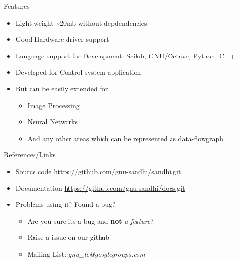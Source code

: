\documentclass{beamer}
\begin{document}
\begin{frame}{Features}

\begin{itemize}
  \item Light-weight \textasciitilde 20mb without depdendencies
  \item Good Hardware driver support
  \item Language support for Development: Scilab, GNU/Octave, Python, C++
  \item Developed for Control system application
  \item But can be easily extended for
  \begin{itemize}
  	\item Image Processing
	\item Neural Networks
	\item And any other areas which can be represented as data-flowgraph
  \end{itemize}
\end{itemize}

\vskip 1cm

\end{frame}


\begin{frame}{References/Links}

\begin{itemize}
  \item Source code \url{https://github.com/gnu-sandhi/sandhi.git}
  \item Documentation \url{https://github.com/gnu-sandhi/docs.git}
  \item Problems using it? Found a bug?
  \begin{itemize}
 	\item Are you sure its a bug and \textbf{not} \textit{a feature}?
	\item Raise a issue on our github
	\item Mailing List: \textit{gnu\_lc@googlegroups.com}
  \end{itemize}
\end{itemize}

\vskip 1cm

\end{frame}
\end{document}
